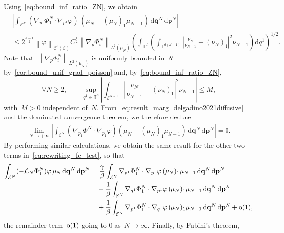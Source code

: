 \documentclass[onefignum,onetabnum]{siamart251216} %
\renewcommand{\d}{\mathrm{d}}
\newcommand{\norm}[1]{\left\lVert#1\right\rVert}
\newcommand{\torus}{\mathbb T}
\newcommand{\mc}[1]{\mathcal{#1}}
\renewcommand{\leq}{\leqslant}
\renewcommand{\geq}{\geqslant}
\newcommand{\mescin}{\mu}
\newcommand{\mespos}{\nu}
\newcommand{\vq}[1]{q^{#1}}
\newcommand{\vp}[1]{p^{#1}}
\newcommand{\vP}[1]{\mathbf{p}^{#1}}
\newcommand{\vQ}[1]{\mathbf{q}^{#1}}
\theoremstyle{plain}
\numberwithin{equation}{section}
\numberwithin{theorem}{section}
\newcounter{ucounter}
\newcommand{\uv}[1]{
  \stepcounter{ucounter}
  \textcolor{orange}{
      \\[.2cm]
    U, comment \arabic{ucounter}. #1
    \\[.2cm]
  }
}
\renewcommand{\uv}[1]{\textcolor{orange}{#1}}
\begin{document}
  Using~\eqref{eq:bound_inf_ratio_ZN}, we obtain
 \begin{align*}
    &\left|\int_{\mc{E}^{N}}(\nabla_{\vp{1}}\Phi_1^N \cdot \nabla_{\vp{1}}\varphi )\,
      (\mescin_N - (\mescin_N)_1\mescin_{N-1})\,\d \vQ{N}\,\d \vP{N}\right| \\
     &\leq 2^{\frac{d-1}{2}}\norm{\varphi}_{\mc{C}^1(\mc{E})}C^{\frac12} \norm{\nabla_p \Phi_i^N}_{L^2(\mescin_N)} \!\left(\!\int_{\torus^d}\left(\!\int_{\torus^{d(N-1)}}\left|\frac{\mespos_N}{\mespos_{N-1}} - (\mespos_N)_1\right|^2\mespos_{N-1}\right)\d \vq{1}\!\right)^{1/2}\!.
 \end{align*}
  Note that~$\norm{\nabla_p \Phi_i^N}_{L^2(\mescin_N)}$ is uniformly bounded in~$N$ by~\cref{cor:bound_unif_grad_poisson} and, by~\eqref{eq:bound_inf_ratio_ZN},
 \[
 \forall N\geq 2, \qquad \sup_{\vq{1}\in \torus^d} \left|\int_{\mc{E}^{N-1}}\left|\frac{\mespos_N}{\mespos_{N-1}} - (\mespos_N)_1\right|^2\mespos_{N-1}\right| \leq M,
 \]
 with~$M>0$ independent of~$N$.
 From~\eqref{eq:result_marg_delgadino2021diffusive} and the dominated convergence theorem, we therefore deduce
\begin{align}
    \label{eq:first_marg_poisson}
    \lim\limits_{N \rightarrow +\infty}
    \left|\int_{\mc{E}^{N}}(\nabla_{p_1}\Phi^N \cdot \nabla_{p_1}\varphi)
     (\mescin_N - (\mescin_N)_1\mescin_{N-1})\,\d \vQ{N}\,\d \vP{N}\right|
    = 0.
\end{align}
By performing similar calculations,
we obtain the same result for the other two terms in~\eqref{eq:rewriting_fc_test}, so that
\begin{align*}
    \int_{\mc{E}^{N}}(-\mathcal{L}_N \Phi_1^N) \varphi \,\mescin_{N}\,\d \vQ{N}\,\d \vP{N}
    &= \frac{\gamma}{\beta}\int_{\mc{E}^{N}}\nabla_{\vp{1}}\Phi_1^N \cdot \nabla_{\vp{1}}\varphi\, (\mescin_N)_1\mescin_{N-1}\,\d \vQ{N}\,\d \vP{N} \\
    &\quad - \frac{1}{\beta}\int_{\mc{E}^{N}}\nabla_{\vq{1}}\Phi_1^N \cdot \nabla_{\vp{1}}\varphi\, (\mescin_N)_1\mescin_{N-1}\,\d \vQ{N}\,\d \vP{N} \\
    &\quad + \frac{1}{\beta}\int_{\mc{E}^{N}}\nabla_{\vp{1}}\Phi_1^N \cdot \nabla_{\vq{1}}\varphi\, (\mescin_N)_1\mescin_{N-1}\,\d \vQ{N}\,\d \vP{N}
    + \rm{o}(1),
\end{align*}
the remainder term~$\rm{o}(1)$ going to 0 as~$N \to \infty$. Finally, by Fubini's theorem,
\end{document}
